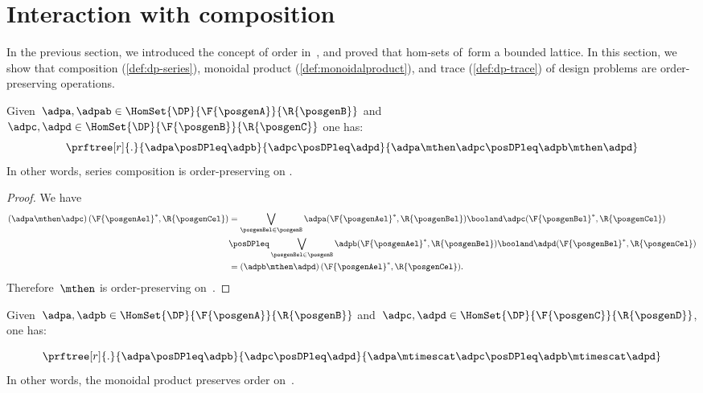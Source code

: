
\section{Interaction with composition}
In the previous section, we introduced the concept of order in~\DP, and proved that hom-sets of~\DP form a bounded lattice.
In this section, we show that composition (\cref{def:dp-series}), monoidal product (\cref{def:monoidalproduct}), and trace (\cref{def:dp-trace}) of design problems are order-preserving operations.

\begin{lemma}
    \label{lem:series_pres_order}
    Given~$\adpa,\adpab \in \HomSet{\DP}{\F{\posgenA}}{\R{\posgenB}}$ and~$\adpc,\adpd \in \HomSet{\DP}{\F{\posgenB}}{\R{\posgenC}}$ one has:
    \begin{equation}
        \prftree[r]{.}{\adpa\posDPleq \adpb}{\adpc\posDPleq \adpd}{\adpa\mthen \adpc \posDPleq \adpb\mthen \adpd}
    \end{equation}
    In other words, series composition is order-preserving on \DP.
\end{lemma}

\begin{proof}
    We have
    \begin{equation}
        \label{eq:series_pres_ord}
        \begin{aligned}
            \left( \adpa\mthen \adpc\right)(\F{\posgenAel}^*,\R{\posgenCel}) & =
            \bigvee_{\posgenBel\in \posgenB}\adpa(\F{\posgenAel}^*,\R{\posgenBel})\booland \adpc(\F{\posgenBel}^*,\R{\posgenCel})                                                                               \\
                                                                             & \posDPleq \bigvee_{\posgenBel\in \posgenB} \adpb(\F{\posgenAel}^*,\R{\posgenBel})\booland \adpd(\F{\posgenBel}^*,\R{\posgenCel}) \\
                                                                             & =\left( \adpb\mthen \adpd\right)(\F{\posgenAel}^*,\R{\posgenCel}).
        \end{aligned}
    \end{equation}
    Therefore~$\mthen$ is order-preserving on~\DP.
\end{proof}

\begin{lemma}
    \label{lem:tens_pres_order}
    Given~$\adpa,\adpb \in \HomSet{\DP}{\F{\posgenA}}{\R{\posgenB}}$ and~$\adpc,\adpd \in \HomSet{\DP}{\F{\posgenC}}{\R{\posgenD}}$, one has:

    \begin{equation}
        \prftree[r]{.}{\adpa\posDPleq \adpb}{\adpc\posDPleq \adpd}{\adpa\mtimescat \adpc \posDPleq \adpb\mtimescat \adpd}
    \end{equation}
    In other words, the monoidal product preserves order on~\DP.
\end{lemma}

